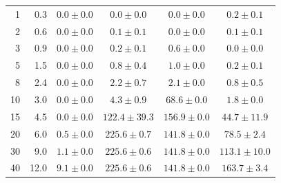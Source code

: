 \begin{table}[t]
\begin{tabular}{r r cccc}
\midrule
 1 &  0.3 & $  0.0 \pm  0.0$ & $  0.0 \pm 0.0$ & $  0.0 \pm 0.0$ & $\mathbf{  0.2 \pm  0.1}$ \\
 2 &  0.6 & $  0.0 \pm  0.0$ & $  0.1 \pm 0.1$ & $  0.0 \pm 0.0$ & $\mathbf{  0.1 \pm  0.1}$ \\
 3 &  0.9 & $  0.0 \pm  0.0$ & $  0.2 \pm 0.1$ & $  0.6 \pm 0.0$ & $  0.0 \pm  0.0$ \\
 5 &  1.5 & $  0.0 \pm  0.0$ & $  0.8 \pm 0.4$ & $\mathbf{  1.0 \pm  0.0}$ & $  0.2 \pm  0.1$ \\
 8 &  2.4 & $  0.0 \pm  0.0$ & $  2.2 \pm 0.7$ & $\mathbf{  2.1 \pm  0.0}$ & $  0.8 \pm  0.5$ \\
10 &  3.0 & $  0.0 \pm  0.0$ & $  4.3 \pm 0.9$ & $\mathbf{ 68.6 \pm  0.0}$ & $  1.8 \pm  0.0$ \\
15 &  4.5 & $  0.0 \pm  0.0$ & $122.4 \pm 39.3$ & $\mathbf{156.9 \pm  0.0}$ & $ 44.7 \pm 11.9$ \\
20 &  6.0 & $  0.5 \pm  0.0$ & $\mathbf{225.6 \pm  0.7}$ & $141.8 \pm  0.0$ & $ 78.5 \pm  2.4$ \\
30 &  9.0 & $  1.1 \pm  0.0$ & $\mathbf{225.6 \pm  0.6}$ & $141.8 \pm  0.0$ & $113.1 \pm 10.0$ \\
40 & 12.0 & $  9.1 \pm  0.0$ & $\mathbf{225.6 \pm  0.6}$ & $141.8 \pm  0.0$ & $163.7 \pm  3.4$ \\
\bottomrule
\end{tabular}
\end{table}
